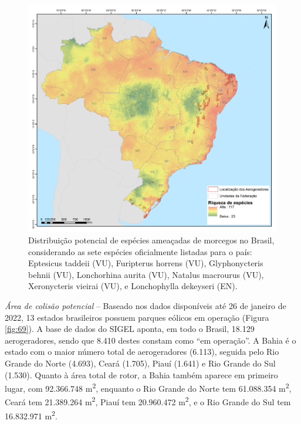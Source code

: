 \documentclass[
  oneside]{scrbook}
\begin{document}
\begin{figure}[H]

{\centering \includegraphics[width=0.75\linewidth]{imagens/cap09/Figura_9.2} 

}

\caption{Distribuição potencial de espécies ameaçadas de morcegos no Brasil, considerando as sete espécies oficialmente listadas para o país: Eptesicus taddeii (VU), Furipterus horrens (VU), Glyphonycteris behnii (VU), Lonchorhina aurita (VU), Natalus macrourus (VU), Xeronycteris vieirai (VU), e Lonchophylla dekeyseri (EN).}\label{fig:68}
\end{figure}

\emph{Área de colisão potencial} -- Baseado nos dados disponíveis até 26 de janeiro de 2022, 13 estados brasileiros possuem parques eólicos em operação (Figura \ref{fig:69}). A base de dados do SIGEL aponta, em todo o Brasil, 18.129 aerogeradores, sendo que 8.410 destes constam como ``em operação''. A Bahia é o estado com o maior número total de aerogeradores (6.113), seguida pelo Rio Grande do Norte (4.693), Ceará (1.705), Piauí (1.641) e Rio Grande do Sul (1.530). Quanto à área total de rotor, a Bahia também aparece em primeiro lugar, com 92.366.748 m\textsuperscript{2}, enquanto o Rio Grande do Norte tem 61.088.354 m\textsuperscript{2}, Ceará tem 21.389.264 m\textsuperscript{2}, Piauí tem 20.960.472 m\textsuperscript{2}, e o Rio Grande do Sul tem 16.832.971 m\textsuperscript{2}.
\end{document}
